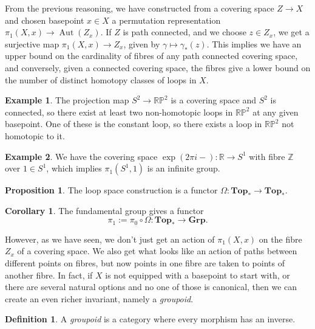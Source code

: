 \documentclass{tufte-handout}
\def\Top {\mathbf{Top}}
\def\Grp {\mathbf{Grp}}
\def\RR{\mathbb{R}}
\def\ZZ{\mathbb{Z}}
\newcommand{\lecturenum}[1]{\marginnote{\color{red}Lecture #1}}
\DeclareMathOperator{\Aut}{Aut}
\theoremstyle{definition}
\newtheorem{prop}{Proposition}
\newtheorem{definition}{Definition}
\newtheorem{example}{Example}
\newtheorem{corollary}{Corollary}
\begin{document}
From the previous reasoning, we have constructed from a covering space $Z\to X$ and 
chosen basepoint $x\in X$ a permutation representation $\pi_1(X,x) \to \Aut(Z_x)$. If 
$Z$ is path connected, and we choose $z\in Z_x$, we get a surjective map $\pi_1(X,x) \to 
Z_x$, given by $\gamma\mapsto \gamma_*(z)$. This implies we have an upper bound on the 
cardinality of fibres of any path connected covering space, and conversely, given a 
connected covering space, the fibres give a lower bound on the number of distinct 
homotopy classes of loops in $X$.

\begin{example}
The projection map $S^2 \to \mathbb{RP}^2$ is a covering space and $S^2$ is connected, 
so there exist at least two non-homotopic loops in $\mathbb{RP}^2$ at any given 
basepoint. One of these is the constant loop, so there exists a loop in $\mathbb{RP}^2$ 
not homotopic to it.
\end{example}

\begin{example}\label{eg:piS^1_infinite}
We have the covering space $\exp(2\pi i-)\colon \RR\to S^1$ with fibre
$\ZZ$ over $1\in S^1$, which implies $\pi_1(S^1,1)$ is an infinite group.
\end{example}

\begin{prop}
The loop space construction is a functor $\Omega\colon \Top_*\to \Top_*$.
\end{prop}


\begin{corollary}
The fundamental group gives a functor 
\[
	\pi_1 := \pi_0 \circ \Omega\colon \Top_*\to \Grp.
\]
\end{corollary}


However,\lecturenum{8} as we have seen, we don't just get an action of $\pi_1(X,x)$ on the fibre $Z_x$ 
of a covering space. We also get what looks like an action of paths between different 
points on fibres, but now points in one fibre are taken to points of another fibre. In 
fact, if $X$ is not equipped with a basepoint to start with, or there are several 
natural options and no one of those is canonical, then we can create an even richer 
invariant, namely a \emph{groupoid}.

\begin{definition}
A \emph{groupoid} is a category where every morphism has an inverse.
\end{definition}
\end{document}
